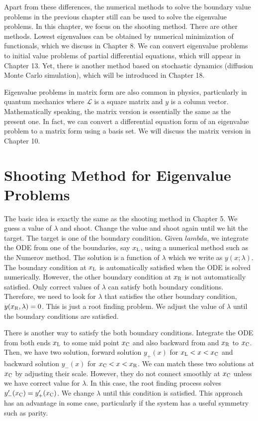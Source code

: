 Apart from these differences, the numerical methods to solve the boundary value problems in the previous chapter still can be used to solve the eigenvalue problems. In this chapter, we focus on the shooting method.   There are other methods. Lowest eigenvalues can be obtained by numerical minimization of functionals, which we discuss in Chapter 8. We can convert eigenvalue problems to initial value problems of partial differential equations, which will appear in Chapter 13.  Yet, there is another method based on stochastic dynamics (diffusion Monte Carlo simulation), which will be introduced in Chapter 18.

Eigenvalue problems in matrix form are also common in physics, particularly in quantum mechanics where $\mathcal{L}$ is a square matrix and $y$ is a column vector.  Mathematically speaking, the matrix version is essentially the same as the present one.  In fact, we can convert a differential equation form of an eigenvalue problem to a matrix form using a basis set.  We will discuss the matrix version in Chapter 10.

\noindent
\section{Shooting Method for Eigenvalue Problems}

The basic idea is exactly the same as the shooting method in Chapter 5.  We guess a value of $\lambda$ and shoot. Change the value  and shoot again until we hit the target.  The target is one of the boundary condition.  Given $lambda$, we integrate the ODE from one of the boundaries, say $x_\textsc{L}$, using a numerical method such as the Numerov method.  The solution is a function of $\lambda$ which we write as $y(x;\lambda)$.  The boundary condition at $x_\textsc{L}$ is automatically satisfied when the ODE is solved numerically.   However, the other boundary condition at $x_\textsc{R}$ is not automatically satisfied. Only correct values of $\lambda$ can satisfy both boundary conditions. Therefore, we need to look for $\lambda$ that satisfies the other boundary condition, $y(x_\textsc{R},\lambda)=0$. This is just a root finding problem.  We adjust the value of $\lambda$ until the boundary conditions are satisfied.  

There is another way to satisfy the both boundary conditions. Integrate the ODE from both ends $x_\textsc{L}$ to some mid point $x_\textsc{C}$ and also backward from and $x_\textsc{R}$  to $x_\textsc{C}$. Then, we have two solution,  forward solution $y_+(x)$ for $x_\textsc{L}<x<x_\textsc{C}$ and backward solution $y_-(x)$ for $x_\textsc{C}<x<x_\textsc{R}$.  We can match these two solutions at $x_\textsc{C}$ by adjusting  their scale.  However, they do not connect smoothly at $x_\textsc{C}$ unless we have correct value for $\lambda$.  In this case, the root finding process solves $y_-^\prime(x_\textsc{C})=y_+^\prime(x_\textsc{C})$. We change $\lambda$ until this condition is satisfied.  This approach has an advantage in some case, particularly if the system has a useful symmetry such as parity.

